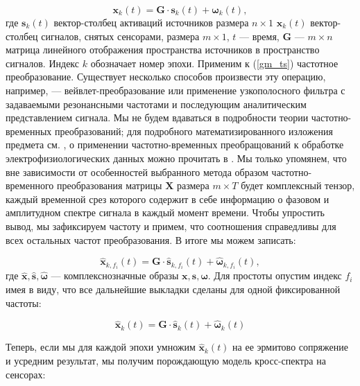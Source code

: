 \begin{equation}
    \mathbf{x}_k(t) = \mathbf{G} \cdot \mathbf{s}_k(t) + \mathbf{\omega}_k(t),
    \label{gm_ts}
\end{equation}
где $\mathbf{s}_k(t)$  вектор-столбец активаций источников размера $n \times 1$
$\mathbf{x}_k(t)$ вектор-столбец сигналов, снятых сенсорами,
размера $m \times 1$, $t$ --- время, $\mathbf{G}$ --- $m \times n$ матрица линейного отображения пространства источников в пространство сигналов.
Индекс $k$ обозначает номер эпохи.
Применим к (\ref{gm_ts}) частотное преобразование. Существует несколько способов произвести
эту операцию, например, --- вейвлет-преобразование или применение узкополосного фильтра
с задаваемыми резонансными частотами и последующим аналитическим представлением сигнала.
Мы не будем вдаваться в подробности теории частотно-временных преобразований;
для подробного математизированного изложения предмета см.
\cite{Oppenheim1998}, о  применении  частотно-временных преобращований к обработке
электрофизиологических данных можно прочитать в \cite{Freeman}.
Мы только упомянем, что вне зависимости от особенностей выбранного
метода образом частотно-временного преобразования матрицы $\mathbf{X}$ размера $m \times T$
будет комплексный тензор, каждый временной срез которого содержит в себе информацию
о фазовом и амплитудном спектре сигнала в каждый момент времени.
Чтобы упростить вывод, мы зафиксируем частоту и примем,
что соотношения справедливы для всех остальных частот преобразования. В итоге мы можем записать:

\begin{equation}
    \hat{\mathbf{x}}_{k,f_i}(t) = \mathbf{G} \cdot \hat{\mathbf{s}}_{k,f_i}(t) + \hat{\mathbf{\omega}}_{k,f_i}(t),
    \label{gm_timefreq}
\end{equation}
где $\hat{\mathbf{x}}, \hat{\mathbf{s}}, \hat{\mathbf{\omega}}$ --- комплекснозначные образы $\mathbf{x}, \mathbf{s}, \mathbf{\omega}$. Для простоты опустим индекс $f_i$ имея в виду, что все дальнейшие выкладки сделаны для одной фиксированной частоты: 

\begin{equation}
    \hat{\mathbf{x}}_k(t) = \mathbf{G} \cdot \hat{\mathbf{s}}_k(t) + \hat{\mathbf{\omega}}_k(t)
    \label{gm_timefreq_no_fi}
\end{equation}

Теперь, если мы для каждой эпохи умножим $\hat{\mathbf{x}}_k(t)$ на ее эрмитово сопряжение  и усредним результат, мы получим порождающую модель кросс-спектра на сенсорах:

